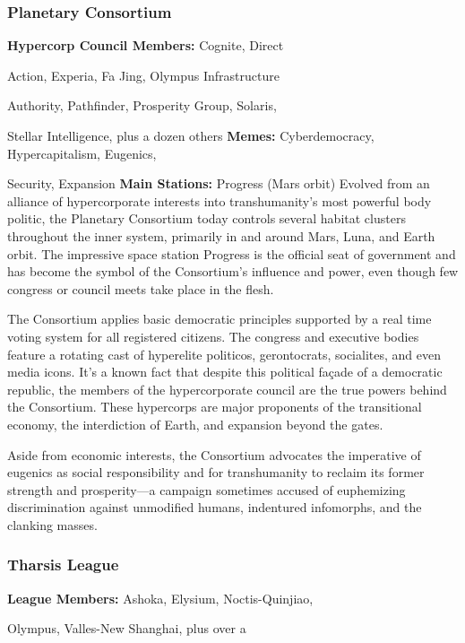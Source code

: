\subsubsection{Planetary Consortium}

\textbf{Hypercorp Council Members:} Cognite, Direct 

Action, Experia, Fa Jing, Olympus Infrastructure 

Authority, Pathfinder, Prosperity Group, Solaris, 

Stellar Intelligence, plus a dozen others
\textbf{Memes:} Cyberdemocracy, Hypercapitalism, Eugenics, 

Security, Expansion
\textbf{Main Stations:} Progress (Mars orbit)
Evolved from an alliance of hypercorporate interests 
into transhumanity's most powerful body politic, the 
Planetary Consortium today controls several habitat 
clusters throughout the inner system, primarily in and 
around Mars, Luna, and Earth orbit. The impressive 
space station Progress is the official seat of government and has become the symbol of the Consortium's 
influence and power, even though few congress or 
council meets take place in the flesh.

The Consortium applies basic democratic principles 
supported by a real time voting system for all registered citizens. The congress and executive bodies 
feature a rotating cast of hyperelite politicos, gerontocrats, socialites, and even media icons. It's a known 
fact that despite this political façade of a democratic 
republic, the members of the hypercorporate council 
are the true powers behind the Consortium. These 
hypercorps are major proponents of the transitional 
economy, the interdiction of Earth, and expansion 
beyond the gates.

Aside from economic interests, the Consortium 
advocates the imperative of eugenics as social responsibility and for transhumanity to reclaim its 
former strength and prosperity—a campaign sometimes accused of euphemizing discrimination against 
unmodified humans, indentured infomorphs, and the 
clanking masses.

\subsubsection{Tharsis League}

\textbf{League Members:} Ashoka, Elysium, Noctis-Quinjiao, 

Olympus, Valles-New Shanghai, plus over a 


